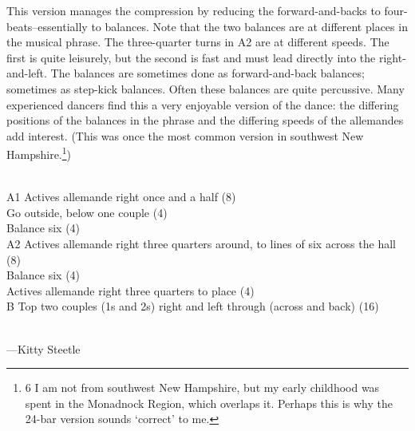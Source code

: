 \documentclass[11pt]{article}
\begin{document}
{\begin{minipage}{7.0in}
This version manages the compression by reducing the forward-and-backs
to four-beats--essentially to balances. Note that the two balances are
at different places in the musical phrase. The three-quarter turns in
A2 are at different speeds. The first is quite leisurely, but the
second is fast and must lead directly into the right-and-left. The
balances are sometimes done as forward-and-back balances; sometimes as
step-kick balances. Often these balances are quite percussive. Many
experienced dancers find this a very enjoyable version of the dance:
the differing positions of the balances in the phrase and the
differing speeds of the allemandes add interest. (This was once the
most common version in southwest New Hampshire.\footnote{6 I am not
  from southwest New Hampshire, but my early childhood was spent in
  the Monadnock Region, which overlaps it. Perhaps this is why the
  24-bar version sounds `correct' to me.})

 {\parindent0pt
      \raggedright
      ~\\
A1 Actives allemande right once and a half (8) \\
Go outside, below one couple (4) \\
Balance six (4) \\
A2 Actives allemande right three quarters around, to lines of six across the hall (8) \\
Balance six (4) \\
Actives allemande right three quarters to place (4) \\
B Top two couples (1s and 2s) right and left through (across and back) (16) \\
~\\
 }
 
---Kitty Steetle

    
  \end{minipage}
}
\end{document}
